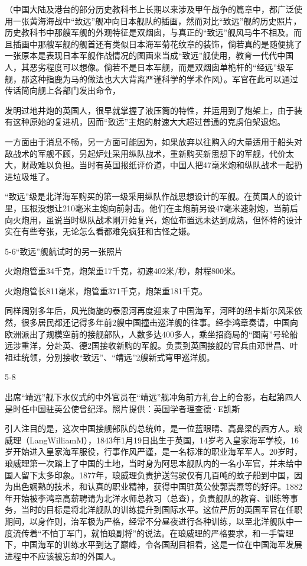 \documentclass[12pt,UTF8]{ctexbook}
\begin{document}
（中国大陆及港台的部分历史教科书上长期以来涉及甲午战争的篇章中，都广泛使用一张黄海海战中“致远”舰冲向日本舰队的插画，然而对比“致远”舰的历史照片，历史教科书中那艘军舰的外观特征是双烟囱，与真正的“致远”舰风马牛不相及。而且插画中那艘军舰的舰首还有类似日本海军菊花纹章的装饰，倘若真的是随便挑了一张原本是表现日本军舰作战情况的图画来当成“致远”舰使用，教育一代代中国人，其恶劣程度可以想像。倘若不是日本军舰，而是双烟囱单桅杆的“经远”级军舰，那这种指鹿为马的做法也大大背离严谨科学的学术作风）。军官在此可以通过传话筒向舰上各部门发出命令，

发明过地井炮的英国人，很早就掌握了液压筒的特性，并运用到了炮架上，由于装有这种原始的复进机，因而“致远”主炮的射速大大超过普通的克虏伯架退炮。

一方面由于消息不畅，另一方面可能因为，如果放弃以往购入的大量适用于船头对敌战术的军舰不顾，另起炉灶采用纵队战术，重新购买新思想下的军舰，代价太大，财政难以负担。当时有英国报纸评价道，中国人把47毫米炮和纵队战术一起扔进垃圾堆了。

“致远”级是北洋海军购买的第一级采用纵队作战思想设计的军舰。在英国人的设计里，压根没想让210毫米主炮向前射击。他们在主炮前另设47毫米速射炮，当前后向火炮用，虽说当时纵队战术刚开始复兴，炮位布置远未达到成熟，但怀特的设计实在有些夸张，无论怎么看都难免疯狂和古怪之嫌。

5-6“致远”舰航试时的另一张照片

火炮炮管重34千克，炮架重17千克，初速402米/秒，射程800米。

火炮炮管长811毫米，炮管重371千克，炮架重181千克。



同样阔别多年后，风光旖旎的泰恩河再度迎来了中国海军，河畔的纽卡斯尔风采依然，很多居民都还记得多年前2艘中国撞击巡洋舰的往事。经李鸿章奏请，中国向欧洲派出了规模空前的接舰部队，人数多达400多人，乘坐招商局的“图南”号轮船远涉重洋，分赴英、德2国接收新购的军舰。负责到英国接舰的官兵由邓世昌、叶祖珪统领，分别接收“致远”、“靖远”2艘新式穹甲巡洋舰。

5-8

出席“靖远”舰下水仪式的中外官员在“靖远”舰冲角前方礼台上的合影，右起第四人是时任中国驻英公使曾纪泽。照片提供：英国学者理查德·E凯斯

引人注目的是，这次中国接舰部队的总统帅，是一位蓝眼睛、高鼻梁的西方人。琅威理（LangWilliamM），1843年1月19日出生于英国，14岁考入皇家海军学校，16岁开始进入皇家海军服役，行事作风严谨，是一名标准的职业海军军人。20岁时，琅威理第一次踏上了中国的土地，当时身为阿思本舰队内的一名小军官，并未给中国人留下太多印象。1877年，琅威理负责护送驾驶仅有几百吨的蚊子船到中国，因为出色娴熟的技术，和认真的职业精神，获得中国驻英公使郭嵩焘等的好评。1882年开始被李鸿章高薪聘请为北洋水师总教习（总查），负责舰队的教育、训练等事务，当时的目标是将北洋舰队的训练提升到国际水平。这位严厉的英国军官在任职期间，以身作则，治军极为严格，经常不分昼夜进行各种训练，以至北洋舰队中一度流传着“不怕丁军门，就怕琅副将”的说法。在琅威理的严格要求，和一手管理下，中国海军的训练水平到达了巅峰，令各国刮目相看，这是一位在中国海军发展进程中不应该被忘却的外国人。
\end{document}
